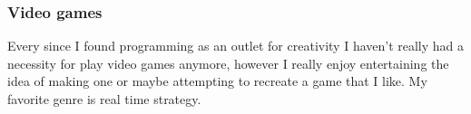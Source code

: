 \documentclass{article}
\begin{document}
\subsubsection{Video games}

Every since I found programming as an outlet for creativity I haven't really had a necessity for play video games anymore, however I really enjoy entertaining the idea of making one or maybe attempting to recreate a game that I like. My favorite genre is real time strategy.



    
\end{document}
